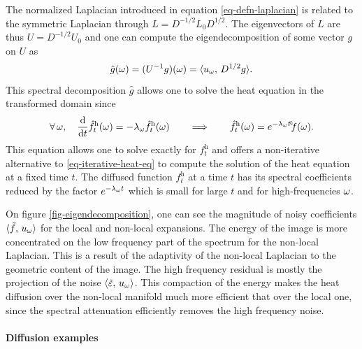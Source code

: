 \documentclass[final]{siamltex}
\newcommand{\heat}{\text{h}}
\newcommand{\F}{f}
\newcommand{\tF}{\tilde \F}
\begin{document}
The normalized Laplacian introduced in equation \eqref{eq-defn-laplacian} is related to the symmetric Laplacian through $L = D^{-1/2} L_0 D^{1/2}$. The eigenvectors of $L$ are thus $U = D^{-1/2} U_0$ and one can compute the eigendecomposition of some vector $g$ on $U$ as 
\begin{equation*}
	\hat g(\omega) = (U^{-1}g)(\omega) = \langle u_\omega,\,D^{1/2} g\rangle.
\end{equation*}
This spectral decomposition $\hat g$ allows one to solve the heat equation in the transformed domain since
\begin{equation}
	\label{eq-spectral-atenuation}
	\foralls \om, \quad \frac{\d}{\d t} \hat \F_t^{\heat}(\om) = -\la_\om \hat \F_t^{\heat}(\om)
	\qquad\Longrightarrow\qquad
	\hat \F_t^{\heat}(\om) = e^{-\la_\om t} \hat \tF(\om).
\end{equation}
This equation allows one to solve exactly for $\F_t^\heat$ and offers a non-iterative alternative to \eqref{eq-iterative-heat-eq} to compute the solution of the heat equation at a fixed time $t$. The diffused function $\F_t^{\heat}$ at a time $t$ has its spectral coefficients reduced by the factor $e^{-\lambda_\omega t}$ which is small for large $t$ and for high-frequencies $\omega$. 

On figure \ref{fig-eigendecomposition}, one can see the magnitude of noisy coefficients $\dotp{\tF}{u_\om}$ for the local and non-local expansions. The energy of the image is more concentrated on the low frequency part of the spectrum for the non-local Laplacian. This is a result of the adaptivity of the non-local Laplacian to the geometric content of the image. The high frequency residual is mostly the projection of the noise $\langle \tilde {\varepsilon},\,u_\omega\rangle$. This compaction of the energy makes the heat diffusion over the non-local manifold much more efficient that over the local one, since the spectral attenuation efficiently removes the high frequency noise.


\paragraph{Diffusion examples}
\end{document}
